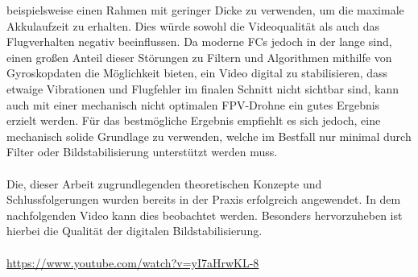 beispielsweise einen Rahmen mit geringer Dicke zu verwenden, um die maximale Akkulaufzeit zu erhalten.
Dies würde sowohl die Videoqualität als auch das Flugverhalten negativ beeinflussen. Da moderne FCs
jedoch in der lange sind, einen großen Anteil dieser Störungen zu Filtern und Algorithmen mithilfe
von Gyroskopdaten die Möglichkeit bieten, ein Video digital zu stabilisieren, dass etwaige Vibrationen
und Flugfehler im finalen Schnitt nicht sichtbar sind, kann auch mit einer mechanisch nicht optimalen
FPV-Drohne ein gutes Ergebnis erzielt werden. Für das bestmögliche Ergebnis empfiehlt es sich jedoch,
eine mechanisch solide Grundlage zu verwenden, welche im Bestfall nur minimal durch Filter oder 
Bildstabilisierung unterstützt werden muss. \\
\\
Die, dieser Arbeit zugrundlegenden theoretischen Konzepte und Schlussfolgerungen
wurden bereits in der Praxis erfolgreich angewendet. In dem nachfolgenden Video kann dies beobachtet
werden. Besonders hervorzuheben ist hierbei die Qualität der digitalen Bildstabilisierung. \\
\\
\href{https://www.youtube.com/watch?v=yI7aHrwKL-8}{https://www.youtube.com/watch?v=yI7aHrwKL-8}
